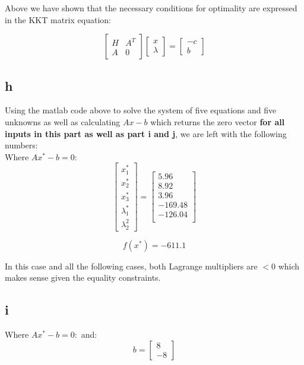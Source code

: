 \documentclass[10pt]{article}
\begin{document}
Above we have shown that the necessary conditions for optimality are expressed in the KKT matrix equation:

\[
\begin{bmatrix}
H & A^T \\
A & 0
\end{bmatrix}
\begin{bmatrix}
x \\
\lambda
\end{bmatrix}
=
\begin{bmatrix}
-c \\
b
\end{bmatrix}
\]




\subsection{h}


Using the matlab code above to solve the system of five equations and five unknowns as well as calculating $Ax - b$ which returns the zero vector \textbf{for all inputs in this part as well as part i and j}, we are left with the following numbers: \\

Where $Ax^*-b = 0:$
\[
\begin{bmatrix}
x_1^* \\
x_2^*\\
x_3^* \\
\lambda_1^* \\
\lambda_2^2
\end{bmatrix} =
\begin{bmatrix}
  5.96 \\
  8.92\\
  3.96 \\
  -169.48 \\
  -126.04 \\
\end{bmatrix}
\]

\[
f(x^*) = -611.1
\] 

In this case and all the following cases, both Lagrange multipliers are $<0$ which makes sense given the equality constraints.

\subsection{i}
Where $Ax^*-b = 0:$ and:
\[
b = 
\begin{bmatrix}
  8 \\
  -8
\end{bmatrix}
\]
\end{document}

